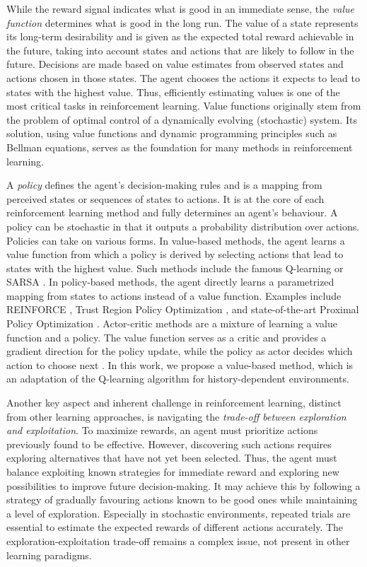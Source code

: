 \documentclass[
    a4paper,
    11pt,
    bibliography=totoc,
    listof=totoc,      
    headinclude=true,
    cleardoublepage=empty,
]{scrbook}
\theoremstyle{plain}
\theoremstyle{definition}
\theoremstyle{remark}
\begin{document}
While the reward signal indicates what is good in an immediate sense, the
\textit{value function} determines what is good in the long run. The value of 
a state represents its long-term desirability and is given as the expected 
total reward achievable in the future, taking into account states and actions 
that are likely to follow in the future. Decisions are made based on value 
estimates from observed states and actions chosen in those states. The 
agent chooses the actions it expects to lead to states with the 
highest value. Thus, efficiently estimating values is one of the most 
critical tasks in reinforcement learning. Value functions originally stem from 
the problem of optimal control of a dynamically evolving (stochastic) system. 
Its solution, using value functions and dynamic programming principles such as 
Bellman equations, serves as the foundation for many methods in reinforcement 
learning.

A \textit{policy} defines the agent's decision-making rules and is a mapping 
from perceived states or sequences of states to actions. It is at the core of 
each reinforcement learning method and fully determines an agent's behaviour. 
A policy can be stochastic in that it outputs a probability distribution over 
actions. Policies can take on various forms. In value-based methods, the agent 
learns a value function from which a policy is derived by selecting actions 
that lead to states with the highest value. Such methods include the famous 
Q-learning \cite{watkins1992_q} or SARSA \cite[Section~6.4]{sutton2018_rli}. 
In policy-based methods, the agent directly learns a parametrized mapping from 
states to actions instead of a value function. Examples include REINFORCE 
\cite{williams1992_ssgacrl}, Trust Region Policy Optimization 
\cite{schulman2015_trpo}, and state-of-the-art Proximal Policy Optimization 
\cite{schulman2017_ppoa}. Actor-critic methods are a mixture of learning  
a value function and a policy. The value function serves as a critic and 
provides a gradient direction for the policy update, while the policy as actor 
decides which action to choose next \cite{konda1999_aa}. In this work, we 
propose a value-based method, which is an adaptation of the Q-learning 
algorithm for history-dependent environments.

Another key aspect and inherent challenge in reinforcement learning, distinct
from other learning approaches, is navigating the \textit{trade-off between
exploration and exploitation}. To maximize rewards, an agent must prioritize
actions previously found to be effective. However, discovering such actions
requires exploring alternatives that have not yet been selected. Thus, the 
agent must balance exploiting known strategies for immediate reward and
exploring new possibilities to improve future decision-making. It may achieve 
this by following a strategy of gradually favouring actions known to be good
ones while maintaining a level of exploration. Especially in stochastic
environments, repeated trials are essential to estimate the expected rewards 
of different actions accurately. The exploration-exploitation trade-off 
remains a complex issue, not present in other learning paradigms.
\end{document}
